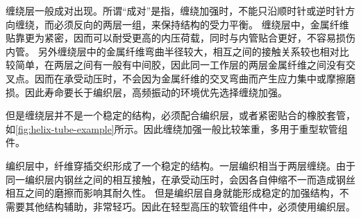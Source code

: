 缠绕层一般成对出现。所谓“成对”是指，缠绕加强时，不能只沿顺时针或逆时针方向缠绕，而必须反向的两层一组，来保持结构的受力平衡。
缠绕层中，金属纤维贴靠更为紧密，因而可以耐受更高的内压荷载，同时与内管贴合更好，不容易损伤内管。
另外缠绕层中的金属纤维弯曲半径较大，相互之间的接触关系较也相对比较简单，在两层之间有一般有中间胶，因此同一工作层的两层金属纤维之间没有交叉点。因而在承受动压时，不会因为金属纤维的交叉弯曲而产生应力集中或摩擦磨损。因此寿命要长于编织层，高频振动的环境优先选择缠绕加强。




但是缠绕层并不是一个稳定的结构，必须配合编织层，或者紧密贴合的橡胶套管，如\ref{fig:helix-tube-example}所示。因此缠绕加强一般比较笨重，多用于重型软管组件。


\begin{figure}[!htbp]
	\centering
	\hspace{1cm}
	\label{fig:helix-tube}
\end{figure}


编织层中，纤维穿插交织形成了一个稳定的结构。一层编织相当于两层缠绕。由于同一编织层内钢丝之间的相互接触，在承受动压时，会因各自伸缩不一而造成钢丝相互之间的磨擦而影响其耐久性。
但是编织层自身就能形成稳定的加强结构，不需要其他结构辅助，非常轻巧。因此在轻型高压的软管组件中，必须使用编织层。



	
	
